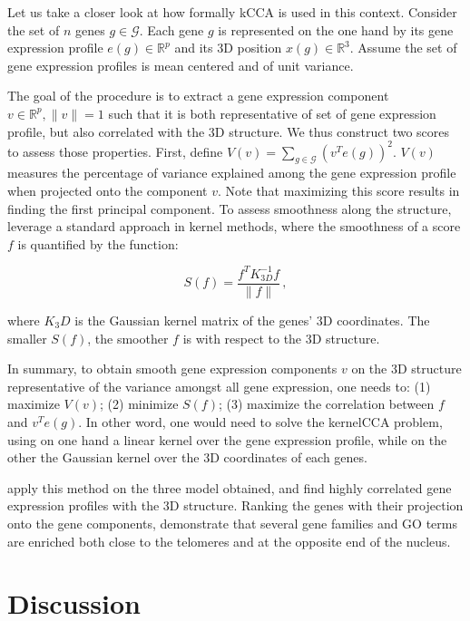 \documentclass[2columns]{article}
\newcommand{\RR}{\mathbb{R}}
\begin{document}
Let us take a closer look at how formally kCCA is used in this context.
Consider the set of $n$ genes $g \in \mathcal{G}$. Each gene $g$ is
represented on the one hand by its gene expression profile $e(g) \in \RR^{p}$
and its 3D position $x(g) \in \RR^3$. Assume the set of gene expression
profiles is mean centered and of unit variance.

The goal of the procedure is to extract a gene expression component $v\in
\RR^p, \|v\|=1$ such that it is both representative of set of gene expression profile,
but also correlated with the 3D structure. We thus construct two scores to
assess those properties. First, define $V(v) = \underset{g \in
\mathcal{G}}{\sum} (v^T e(g))^2$. $V(v)$ measures the percentage of variance
explained among the gene expression profile when projected onto the component
$v$. Note that maximizing this score results in finding the first principal
component. To assess smoothness along the structure,
\citet{ay:three-dimensional} leverage a standard approach in kernel methods,
where the smoothness of a score $f$ is quantified by the function:

\begin{equation}
S(f) = \frac{f^TK^{-1}_{3D}f}{\|f\|}\,,
\end{equation}

where $K_3D$ is the Gaussian kernel matrix of the genes' 3D coordinates. The
smaller $S(f)$, the smoother $f$ is with respect to the 3D structure.

In summary, to obtain smooth gene expression components $v$ on the 3D
structure representative of the variance amongst all gene expression, one
needs to: (1) maximize $V(v)$; (2) minimize $S(f)$; (3) maximize the
correlation between $f$ and $v^T e(g)$. In other word, one would need to solve
the kernelCCA problem, using on one hand a linear kernel over the gene
expression profile, while on the other the Gaussian kernel over the 3D
coordinates of each genes.

\citet{ay:three-dimensional} apply this method on the three model obtained,
and find highly correlated gene expression profiles with the 3D structure.
Ranking the genes with their projection onto the gene components,
\citet{ay:three-dimensional} demonstrate that several gene families and GO
terms are enriched both close to the telomeres and at the opposite end of the
nucleus.

\section*{Discussion}
\end{document}
